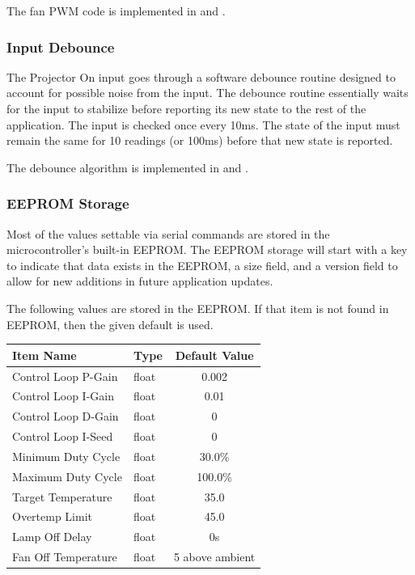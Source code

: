 \documentclass{article}
\begin{document}
The fan PWM code is implemented in  and .

\subsubsection{Input Debounce} \label{sssec:FWAppDebounce}
The Projector On input goes through a software debounce routine designed to account for possible
noise from the input.  The debounce routine essentially waits for the input to stabilize before
reporting its new state to the rest of the application.  The input is checked once every 10ms.
The state of the input must remain the same for 10 readings (or 100ms) before that new state is
reported.

The debounce algorithm is implemented in  and .

\subsubsection{EEPROM Storage} \label{sssec:FWAppStorage}
Most of the values settable via serial commands are stored in the microcontroller's built-in
EEPROM.  The EEPROM storage will start with a key to indicate that data exists in the EEPROM, a size
field, and a version field to allow for new additions in future application updates.

The following values are stored in the EEPROM.  If that item is not found in EEPROM, then the given
default is used.

\begin{center}
    \begin{tabular}{l|l|c}
        Item Name & Type & Default Value \\
        \hline
        Control Loop P-Gain & float & 0.002 \\
        Control Loop I-Gain & float & 0.01 \\
        Control Loop D-Gain & float & 0 \\
        Control Loop I-Seed & float & 0 \\
        Minimum Duty Cycle & float & 30.0\% \\
        Maximum Duty Cycle & float & 100.0\% \\
        Target Temperature & float & 35.0\textcelsius{} \\
        Overtemp Limit & float & 45.0\textcelsius{} \\
        Lamp Off Delay & float & 0s \\
        Fan Off Temperature & float & 5\textcelsius{} above ambient \\
    \end{tabular}
\end{center}
\end{document}
